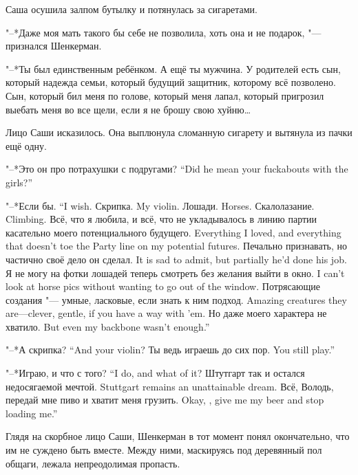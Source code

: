 Саша осушила залпом бутылку и потянулась за сигаретами.

"--*Даже моя мать такого бы себе не позволила, хоть она и не подарок, "--- признался Шенкерман.

"--*Ты был единственным ребёнком.
А ещё ты мужчина.
У родителей есть сын, который надежда семьи, который будущий защитник, которому всё позволено.
Сын, который бил меня по голове, который меня лапал, который пригрозил выебать меня во все щели, если я не брошу свою хуйню\ldots{}

Лицо Саши исказилось.
Она выплюнула сломанную сигарету и вытянула из пачки ещё одну.

{"--*Это он про потрахушки с подругами?}
{``Did he mean your fuckabouts with the girls?''}

{"--*Если бы.}
{``I wish.}
{Скрипка.}
{My violin.}
{Лошади.}
{Horses.}
{Скалолазание.}
{Climbing.}
{Всё, что я любила, и всё, что не укладывалось в линию партии касательно моего потенциального будущего.}
{Everything I loved, and everything that doesn't toe the Party line on my potential futures.}
{Печально признавать, но частично своё дело он сделал.}
{It is sad to admit, but partially he'd done his job.}
{Я не могу на фотки лошадей теперь смотреть без желания выйти в окно.}
{I can't look at horse pics without wanting to go out of the window.}
{Потрясающие создания "--- умные, ласковые, если знать к ним подход.}
{Amazing creatures they are---clever, gentle, if you have a way with 'em.}
{Но даже моего характера не хватило.}
{But even my backbone wasn't enough.''}

{"--*А скрипка?}
{``And your violin?}
{Ты ведь играешь до сих пор.}
{You still play.''}

{"--*Играю, и что с того?}
{``I do, and what of it?}
{Штутгарт так и остался недосягаемой мечтой.}
{Stuttgart remains an unattainable dream.}
{Всё, Володь, передай мне пиво и хватит меня грузить.}
{Okay, \Volod, give me my beer and stop loading me.''}

Глядя на скорбное лицо Саши, Шенкерман в тот момент понял окончательно, что им не суждено быть вместе.
Между ними, маскируясь под деревянный пол общаги, лежала непреодолимая пропасть.

\chapter{}

